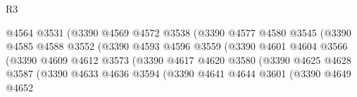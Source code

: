 \begin{lexlean}{R3}
\begin{coremodule}
                                          @4564
                                          @3531
                                          (@3390
                                            @4569
                                            @4572
                                            @3538
                                            (@3390
                                              @4577
                                              @4580
                                              @3545
                                              (@3390
                                                @4585
                                                @4588
                                                @3552
                                                (@3390
                                                  @4593
                                                  @4596
                                                  @3559
                                                  (@3390
                                                    @4601
                                                    @4604
                                                    @3566
                                                    (@3390
                                                      @4609
                                                      @4612
                                                      @3573
                                                      (@3390
                                                        @4617
                                                        @4620
                                                        @3580
                                                        (@3390
                                                          @4625
                                                          @4628
                                                          @3587
                                                          (@3390
                                                            @4633
                                                            @4636
                                                            @3594
                                                            (@3390
                                                              @4641
                                                              @4644
                                                              @3601
                                                              (@3390
                                                                @4649
                                                                @4652

\end{coremodule}
\end{lexlean}
